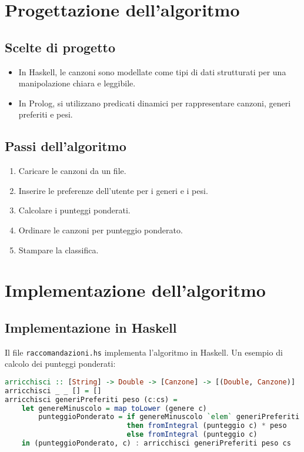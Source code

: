 \documentclass[a4paper,11pt]{article}
\begin{document}
\newpage
\section{Progettazione dell'algoritmo}
\subsection{Scelte di progetto}
\begin{itemize}
    \item In Haskell, le canzoni sono modellate come tipi di dati strutturati per una manipolazione chiara e leggibile.
    \item In Prolog, si utilizzano predicati dinamici per rappresentare canzoni, generi preferiti e pesi.
\end{itemize}

\subsection{Passi dell'algoritmo}
\begin{enumerate}
    \item Caricare le canzoni da un file.
    \item Inserire le preferenze dell'utente per i generi e i pesi.
    \item Calcolare i punteggi ponderati.
    \item Ordinare le canzoni per punteggio ponderato.
    \item Stampare la classifica.
\end{enumerate}

\newpage
\section{Implementazione dell'algoritmo}
\subsection{Implementazione in Haskell}
Il file \texttt{raccomandazioni.hs} implementa l'algoritmo in Haskell. Un esempio di calcolo dei punteggi ponderati:
\begin{lstlisting}[language=Haskell,caption=Calcolo dei punteggi ponderati]
arricchisci :: [String] -> Double -> [Canzone] -> [(Double, Canzone)]
arricchisci _ _ [] = []
arricchisci generiPreferiti peso (c:cs) =
    let genereMinuscolo = map toLower (genere c)
        punteggioPonderato = if genereMinuscolo `elem` generiPreferiti
                             then fromIntegral (punteggio c) * peso
                             else fromIntegral (punteggio c)
    in (punteggioPonderato, c) : arricchisci generiPreferiti peso cs
\end{lstlisting}
\end{document}
